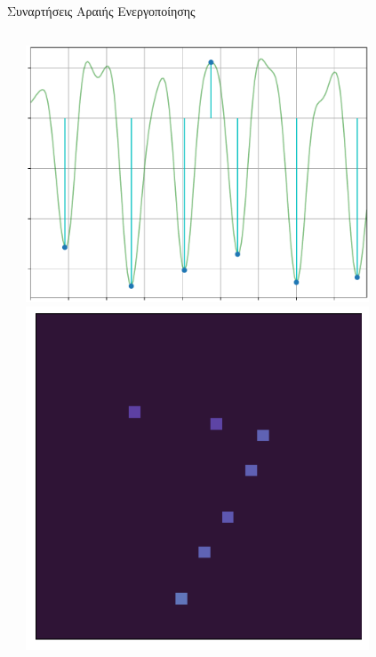 \documentclass{beamer}
\begin{document}
\begin{frame}[c]{Συναρτήσεις Αραιής Ενεργοποίησης}
	\begin{columns}
		\begin{column}{0.6\textwidth}
		\end{column}
		\begin{column}{0.4\textwidth}
			\begin{minipage}{\linewidth}
				\includegraphics[width=0.8\textwidth]{"images_1d/UCI-epilepsy_extrema_1d_2_activations_0"}
				\\
				\includegraphics[width=0.8\textwidth]{"images_2d/MNIST_extrema_2d_2_activations_0"}
			\end{minipage}
		\end{column}
	\end{columns}
\end{frame}
\end{document}
